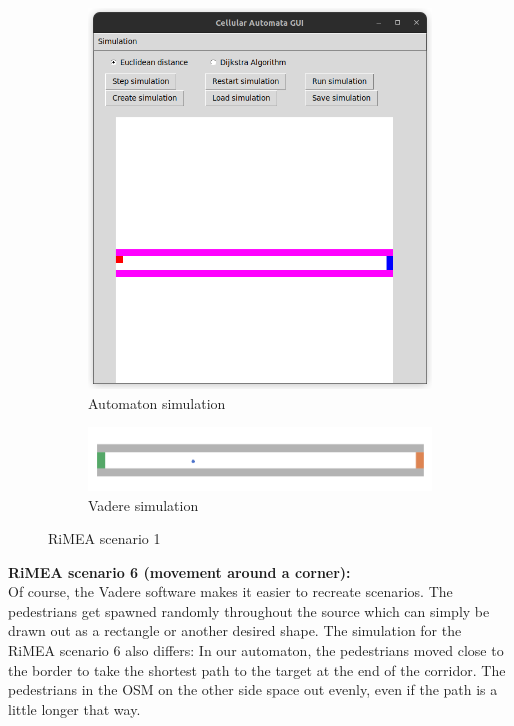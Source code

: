 \begin{figure}[H]
 \centering
 \begin{subfigure}[b]{0.4\textwidth}
     \centering
     \includegraphics[width=\textwidth]{images/1-task1_initial.png}
    \caption{Automaton simulation}
    \label{fig: rimea_1a}
 \end{subfigure}
 \begin{subfigure}[b]{0.4\textwidth}
      \centering
     \includegraphics[width=\textwidth]{images/RIMEA1_2.png}
     \caption{Vadere simulation}
     \label{fig: rimea_1b}
 \end{subfigure}
 \caption{RiMEA scenario 1}
 \label{fig: rimea_1}
\end{figure}

\textbf{RiMEA scenario 6 (movement around a corner):}\\
Of course, the Vadere software makes it easier to recreate scenarios. The pedestrians get spawned randomly throughout the source which can simply be drawn out as a rectangle or another desired shape. The simulation for the RiMEA scenario 6 also differs: In our automaton, the pedestrians moved close to the border to take the shortest path to the target at the end of the corridor. The pedestrians in the OSM on the other side space out evenly, even if the path is a little longer that way. 

